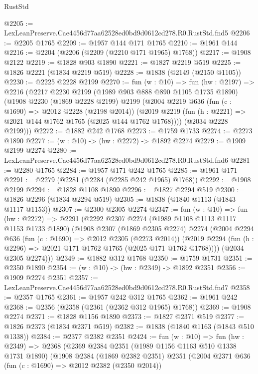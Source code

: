 \begin{lexlean}{RustStd}
\begin{coremodule}
@2205 := LexLeanPreserve.Cae4456d77aa62528ed0bd9d0612cd278.R0.RustStd.fnd5
@2206 := @2205 @1765
@2209 := @1957 @144 @171 @1765
@2210 := @1961 @144
@2216 := @2204 (@2206 (@2209 (@2210 @171 @1965) @1768))
@2217 := @1908 @2122
@2219 := @1828 @903 @1890
@2221 := @1827 @2219 @519
@2225 := @1826 @2221 (@1834 @2219 @519)
@2228 := @1838 (@2149 (@2150 @1105))
@2230 := @2225 @2228 @2199
@2270 := fun (w : @10) =>
  fun (hw : @2197) =>
  @2216
    (@2217
      @2230
      @2199
      (@1989 @903 @888 @890 @1105 @1735 @1890)
      (@1908
        @2230
        (@1869 @2228 @2199)
        @2199
        (@2004
          @2219
          @636
          (fun (c : @1690) => @2012 @2228 (@2198 @2014))
          (@2019 @2219 (fun (h : @2221) => @2021 @144 @1762 @1765 (@2025 @144 @1762 @1768))))
        (@2034 @2228 @2199)))
@2272 := @1882 @242 @1768
@2273 := @1759 @1733
@2274 := @2273 @1890
@2277 := (w : @10) -> (hw : @2272) -> @1892 @2274
@2279 := @1909 @2199 @2274
@2280 := LexLeanPreserve.Cae4456d77aa62528ed0bd9d0612cd278.R0.RustStd.fnd6
@2281 := @2280 @1765
@2284 := @1957 @171 @242 @1765
@2285 := @1961 @171
@2291 := @2279 (@2281 (@2284 (@2285 @242 @1965) @1768))
@2292 := @1908 @2199
@2294 := @1828 @1108 @1890
@2296 := @1827 @2294 @519
@2300 := @1826 @2296 (@1834 @2294 @519)
@2305 := @1838 (@1840 @1113 (@1843 @1117 @1153))
@2307 := @2300 @2305 @2274
@2347 := fun (w : @10) =>
  fun (hw : @2272) =>
  @2291
    (@2292
      @2307
      @2274
      (@1989 @1108 @1113 @1117 @1153 @1733 @1890)
      (@1908
        @2307
        (@1869 @2305 @2274)
        @2274
        (@2004
          @2294
          @636
          (fun (c : @1690) => @2012 @2305 (@2273 @2014))
          (@2019 @2294 (fun (h : @2296) => @2021 @171 @1762 @1765 (@2025 @171 @1762 @1768))))
        (@2034 @2305 @2274)))
@2349 := @1882 @312 @1768
@2350 := @1759 @1731
@2351 := @2350 @1890
@2354 := (w : @10) -> (hw : @2349) -> @1892 @2351
@2356 := @1909 @2274 @2351
@2357 := LexLeanPreserve.Cae4456d77aa62528ed0bd9d0612cd278.R0.RustStd.fnd7
@2358 := @2357 @1765
@2361 := @1957 @242 @312 @1765
@2362 := @1961 @242
@2368 := @2356 (@2358 (@2361 (@2362 @312 @1965) @1768))
@2369 := @1908 @2274
@2371 := @1828 @1156 @1890
@2373 := @1827 @2371 @519
@2377 := @1826 @2373 (@1834 @2371 @519)
@2382 := @1838 (@1840 @1163 (@1843 @510 @1338))
@2384 := @2377 @2382 @2351
@2424 := fun (w : @10) =>
  fun (hw : @2349) =>
  @2368
    (@2369
      @2384
      @2351
      (@1989 @1156 @1163 @510 @1338 @1731 @1890)
      (@1908
        @2384
        (@1869 @2382 @2351)
        @2351
        (@2004
          @2371
          @636
          (fun (c : @1690) => @2012 @2382 (@2350 @2014))

\end{coremodule}
\end{lexlean}

